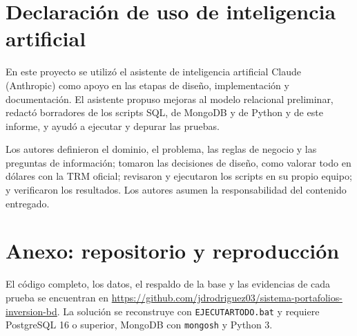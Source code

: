 \documentclass[10pt,letterpaper]{article}
\renewcommand{\_}{\oldUS\allowbreak}
\begin{document}
\section{Declaración de uso de inteligencia artificial}

En este proyecto se utilizó el asistente de inteligencia artificial Claude (Anthropic) como apoyo en las etapas de diseño, implementación y documentación. El asistente propuso mejoras al modelo relacional preliminar, redactó borradores de los scripts SQL, de MongoDB y de Python y de este informe, y ayudó a ejecutar y depurar las pruebas.

Los autores definieron el dominio, el problema, las reglas de negocio y las preguntas de información; tomaron las decisiones de diseño, como valorar todo en dólares con la TRM oficial; revisaron y ejecutaron los scripts en su propio equipo; y verificaron los resultados. Los autores asumen la responsabilidad del contenido entregado.

\section*{Anexo: repositorio y reproducción}

El código completo, los datos, el respaldo de la base y las evidencias de cada prueba se encuentran en \url{https://github.com/jdrodriguez03/sistema-portafolios-inversion-bd}. La solución se reconstruye con \texttt{EJECUTAR\_TODO.bat} y requiere PostgreSQL 16 o superior, MongoDB con \texttt{mongosh} y Python 3.
\end{document}
